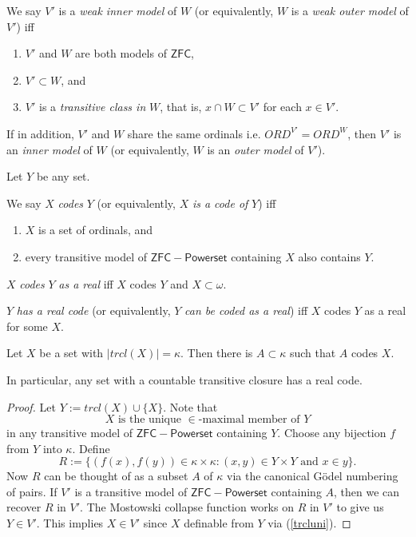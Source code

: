 \documentclass[12pt]{article}
\numberwithin{equation}{section}
\begin{document}
\begin{defi}\label{inoutmodels}
We say $V'$ is a \emph{weak inner model} of $W$ (or equivalently, $W$ is a \emph{weak outer model} of $V'$) iff
\begin{enumerate}[label=(\alph*)]
    \item $V'$ and $W$ are both models of $\mathsf{ZFC}$,
    \item $V' \subset W$, and
    \item $V'$ is a \textit{transitive class in} $W$, that is, $x \cap W \subset V'$ for each $x \in V'$.
\end{enumerate}
If in addition, $V'$ and $W$ share the same ordinals i.e. $ORD^{V'} = ORD^W$, then $V'$ is an \emph{inner model} of $W$ (or equivalently, $W$ is an \emph{outer model} of $V'$).
\end{defi}
\begin{defi}
Let $Y$ be any set.

We say $X$ \emph{codes} $Y$ (or equivalently, $X$ \emph{is a code of} $Y$) iff 
\begin{enumerate}[label=(\alph*)]
    \item $X$ is a set of ordinals, and
    \item every transitive model of $\mathsf{ZFC - Powerset}$ containing $X$ also contains $Y$.
\end{enumerate}

$X$ \emph{codes} $Y$ \emph{as a real} iff $X$ codes $Y$ and $X \subset \omega$.

$Y$ \emph{has a real code} (or equivalently, $Y$ \emph{can be coded as a real}) iff $X$ codes $Y$ as a real for some $X$.
\end{defi}

\begin{lem}\label{setcode}
Let $X$ be a set with $|trcl(X)| = \kappa$. Then there is $A \subset \kappa$ such that $A$ codes $X$.

In particular, any set with a countable transitive closure has a real code.
\end{lem}

\begin{proof}
Let $Y := trcl(X) \cup \{X\}$. Note that 
\begin{equation}\label{trcluni}
    X \text{ is the unique } \! \in \!\text{-maximal member of } Y
\end{equation} 
in any transitive model of $\mathsf{ZFC - Powerset}$ containing $Y$. Choose any bijection $f$ from $Y$ into $\kappa$. Define $$R := \{(f(x), f(y)) \in \kappa \times \kappa : (x, y) \in Y \times Y \text{ and } x \in y\}.$$ Now $R$ can be thought of as a subset $A$ of $\kappa$ via the canonical G\"{o}del numbering of pairs. If $V'$ is a transitive model of $\mathsf{ZFC - Powerset}$ containing $A$, then we can recover $R$ in $V'$. The Mostowski collapse function works on $R$ in $V'$ to give us $Y \in V'$. This implies $X \in V'$ since $X$ definable from $Y$ via (\ref{trcluni}).
\end{proof}
\end{document}
